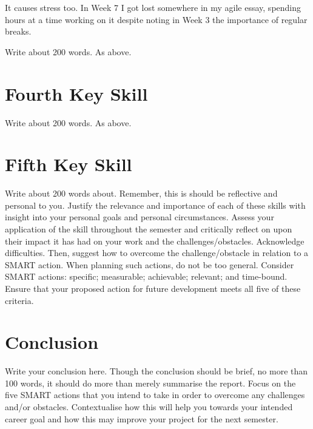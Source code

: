 \documentclass{scrartcl}
\begin{document}
It causes stress too. In Week 7 I got lost somewhere in my agile essay, spending hours at a time working on it despite noting in Week 3 the importance of regular breaks.

Write about 200 words. As above.

\section{Fourth Key Skill}

Write about 200 words. As above.

\section{Fifth Key Skill}

Write about 200 words about. Remember, this is should be reflective and personal to you. Justify the relevance and importance of each of these skills with insight into your personal goals and personal circumstances. Assess your application of the skill throughout the semester and critically reflect on upon their impact it has had on your work and the challenges/obstacles. Acknowledge difficulties. Then, suggest how to overcome the challenge/obstacle in relation to a SMART action. When planning such actions, do not be too general. Consider SMART actions:
specific; measurable; achievable; relevant; and time-bound. Ensure that your proposed action for future development meets all five of these criteria.

\section{Conclusion}

Write your conclusion here. Though the conclusion should be brief, no more than 100 words, it should do more than merely summarise the report. Focus on the five SMART actions that you intend to take in order to overcome any challenges and/or obstacles. Contextualise how this will help you towards your intended career goal and how this may improve your project for the next semester.



\end{document}

